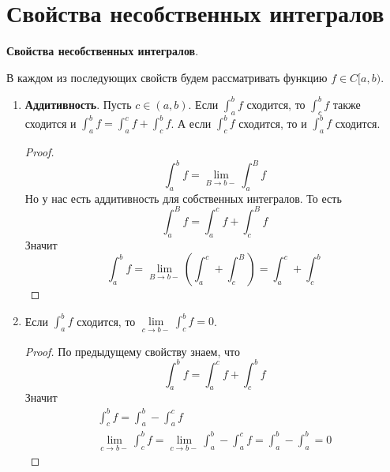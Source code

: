 \section{Свойства несобственных интегралов}
\textbf{Свойства несобственных интегралов}.

В каждом из последующих свойств будем рассматривать функцию $f \in C[a, b)$.

\begin{enumerate}
  \item \textbf{Аддитивность}. Пусть $c \in (a, b)$. Если $\int_{a}^{b} f$ сходится, то $\int_{c}^{b} f$ также сходится и $\int_{a}^{b} f = \int_{a}^{c} f + \int_{c}^{b} f$. А если $\int_{c}^{b} f$ сходится, то и $\int_{a}^{b} f$ сходится.
  \begin{proof}
    \begin{equation*}
      \int_{a}^{b} f = \lim\limits_{B \to b-} \int_{a}^{B} f
    \end{equation*}
    Но у нас есть аддитивность для собственных интегралов. То есть
    \begin{equation*}
      \int_{a}^{B} f = \int_{a}^{c} f + \int_{c}^{B} f
    \end{equation*}
    Значит
    \begin{equation*}
      \int_{a}^{b} f = \lim\limits_{B \to b-} \left( \int_{a}^{c} + \int_{c}^{B} \right) =
      \int_{a}^{c} + \int_{c}^{b}
    \end{equation*}
  \end{proof}

  \item Если $\int_{a}^{b} f$ сходится, то $\lim\limits_{c \to b-} \int_{c}^{b} f = 0$.
  \begin{proof}
    По предыдущему свойству знаем, что
    \begin{equation*}
      \int_{a}^{b} f = \int_{a}^{c} f + \int_{c}^{b} f
    \end{equation*}
    Значит
    \begin{equation*}
      \begin{gathered}
        \int_{c}^{b} f = \int_{a}^{b} - \int_{a}^{c} f \\
        \lim\limits_{c \to b-} \int_{c}^{b} f = \lim\limits_{c \to b-} \int_{a}^{b} - \int_{a}^{c} f = \int_{a}^{b}  -\int_{a}^{b} = 0
      \end{gathered}
    \end{equation*}
  \end{proof}


\end{enumerate}
